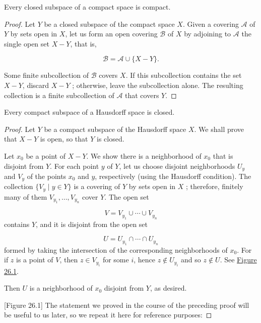 \begin{theorem}
\label{thm:\thetheorem}
Every closed subspace of a compact space is compact.
\end{theorem}

\begin{proof}
Let \(Y\) be a closed subspace of the compact space \(X\). Given a covering \(\mathcal{A}\) of \(Y\) by sets open in \(X\), let us form an open covering \(\mathcal{B}\) of \(X\) by adjoining to \(\mathcal{A}\) the single open set \(X - Y\), that is,

\[
\mathcal{B} = \mathcal{A} \cup \{ X - Y\}.
\]

Some finite subcollection of \(\mathcal{B}\) covers \(X\). If this subcollection contains the set \(X - Y\), discard \(X - Y\) ; otherwise, leave the subcollection alone. The resulting collection is a finite subcollection of \(\mathcal{A}\) that covers \(Y\).
\end{proof}

\begin{theorem}
\label{thm:\thetheorem}
Every compact subspace of a Hausdorff space is closed.
\end{theorem}

\begin{proof}
Let \(Y\) be a compact subspace of the Hausdorff space \(X\). We shall prove that \(X - Y\) is open, so that \(Y\) is closed.

Let \(x_{0}\) be a point of \(X - Y\). We show there is a neighborhood of \(x_{0}\) that is disjoint from \(Y\). For each point \(y\) of \(Y\), let us choose disjoint neighborhoods \(U_{y}\) and \(V_{y}\) of the points \(x_{0}\) and \(y\), respectively (using the Hausdorff condition). The collection \(\{ {V_{y} \mid y \in Y}\}\) is a covering of \(Y\) by sets open in \(X\) ; therefore, finitely many of them \(V_{y_{1}},\ldots ,V_{y_{n}}\) cover \(Y\). The open set

\[
V = V_{y_{1}} \cup \cdots \cup {V}_{y_{n}}
\]
contains \(Y\), and it is disjoint from the open set

\[
U = U_{y_{1}} \cap \cdots \cap {U}_{y_{n}}
\]
formed by taking the intersection of the corresponding neighborhoods of \(x_{0}\). For if \(z\) is a point of \(V\), then \(z \in {V}_{y_{i}}\) for some \(i\), hence \(z \notin {U}_{y_{i}}\) and so \(z \notin U\). See \hyperref[fig:26.1]{Figure 26.1}.

Then \(U\) is a neighborhood of \(x_{0}\) disjoint from \(Y\), as desired.

[Figure 26.1]
The statement we proved in the course of the preceding proof will be useful to us later, so we repeat it here for reference purposes:
\end{proof}

